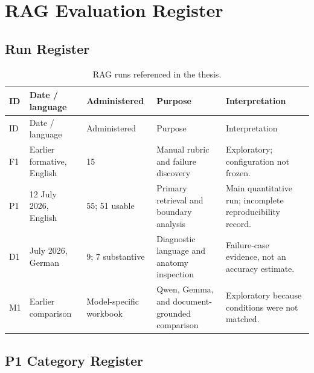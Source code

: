 \chapter{RAG Evaluation Register}
\label{app:rag-templates}

\section{Run Register}
\label{app:rag-run-register}

\setlength{\tabcolsep}{3pt}
\begin{longtable}{L{0.08\textwidth}L{0.17\textwidth}L{0.16\textwidth}L{0.19\textwidth}L{0.25\textwidth}}
\caption{RAG runs referenced in the thesis.}\label{tab:rag-run-register}\\
\toprule
ID & Date / language & Administered & Purpose & Interpretation \\
\midrule
\endfirsthead
\toprule
ID & Date / language & Administered & Purpose & Interpretation \\
\midrule
\endhead
F1 & Earlier formative, English & 15 & Manual rubric and failure discovery & Exploratory; configuration not frozen. \\
P1 & 12 July 2026, English & 55; 51 usable & Primary retrieval and boundary analysis & Main quantitative run; incomplete reproducibility record. \\
D1 & July 2026, German & 9; 7 substantive & Diagnostic language and anatomy inspection & Failure-case evidence, not an accuracy estimate. \\
M1 & Earlier comparison & Model-specific workbook & Qwen, Gemma, and document-grounded comparison & Exploratory because conditions were not matched. \\
\bottomrule
\end{longtable}

\section{P1 Category Register}
\label{app:rag-category-register}

